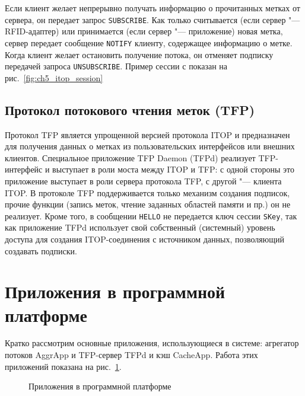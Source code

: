 Если клиент желает непрерывно получать информацию о прочитанных метках от сервера, он передает запрос \texttt{SUBSCRIBE}. Как только считывается (если сервер "--- RFID-адаптер) или принимается (если сервер "--- приложение) новая метка, сервер передает сообщение \texttt{NOTIFY} клиенту, содержащее информацию о метке. Когда клиент желает остановить получение потока, он отменяет подписку передачей запроса \texttt{UNSUBSCRIBE}. Пример сессии с показан на рис.~\ref{fig:ch5_itop_session}


\subsection{Протокол потокового чтения меток (TFP)}\label{sec:ch5_tfp}

Протокол TFP является упрощенной версией протокола ITOP и предназначен для получения данных о метках из пользовательских интерфейсов или внешних клиентов. Специальное приложение TFP Daemon (TFPd) реализует TFP-интерфейс и выступает в роли моста между ITOP и TFP: с одной стороны это приложение выступает в роли сервера протокола TFP, с другой "--- клиента ITOP. В протоколе TFP поддерживается только механизм создания подписок, прочие функции (запись меток, чтение заданных областей памяти и пр.) он не реализует. Кроме того, в сообщении \texttt{HELLO} не передается ключ сессии \texttt{SKey}, так как приложение TFPd использует свой собственный (системный) уровень доступа для создания ITOP-соединения с источником данных, позволяющий создавать подписки.



\section{Приложения в программной платформе}\label{sec:ch5_applications}

Кратко рассмотрим основные приложения, использующиеся в системе: агрегатор потоков AggrApp и TFP-сервер TFPd и кэш CacheApp. Работа этих приложений показана на рис.~\ref{fig:ch5_applications_scheme}.

\begin{figure}[ht] 
  \caption{Приложения в программной платформе}
  \label{fig:ch5_applications_scheme}
\end{figure}

